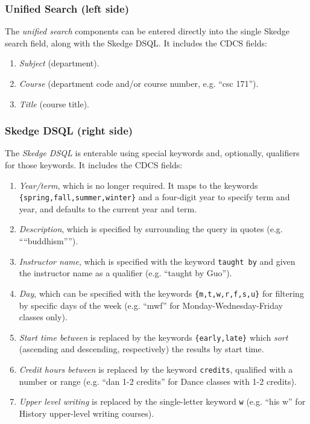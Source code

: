 \subsubsection{Unified Search (left side)}

The \emph{unified search} components can be entered directly into the single Skedge search field, along with the Skedge DSQL. It includes the CDCS fields:

\begin{enumerate}
  \item \emph{Subject} (department).
  \item \emph{Course} (department code and/or course number, e.g. ``csc 171'').
  \item \emph{Title} (course title).
\end{enumerate}

\subsubsection{Skedge DSQL (right side)}

The \emph{Skedge DSQL} is enterable using special keywords and, optionally, qualifiers for those keywords. It includes the CDCS fields:

\begin{enumerate}
  \item \emph{Year/term}, which is no longer required. It maps to the keywords {\tt \{spring,fall,summer,winter\}} and a four-digit year to specify term and year, and defaults to the current year and term.

  \item \emph{Description}, which is specified by surrounding the query in quotes (e.g. ````buddhism'''').

  \item \emph{Instructor name}, which is specified with the keyword {\tt taught by} and given the instructor name as a qualifier (e.g. ``taught by Guo'').

  \item \emph{Day}, which can be specified with the keywords {\tt \{m,t,w,r,f,s,u\}} for filtering by specific days of the week (e.g. ``mwf'' for Monday-Wednesday-Friday classes only).

  \item \emph{Start time between} is replaced by the keywords {\tt \{early,late\}} which \emph{sort} (ascending and descending, respectively) the results by start time.

  \item \emph{Credit hours between} is replaced by the keyword {\tt credits}, qualified with a number or range (e.g. ``dan 1-2 credits'' for Dance classes with 1-2 credits).

  \item \emph{Upper level writing} is replaced by the single-letter keyword {\tt w} (e.g. ``his w'' for History upper-level writing courses).
\end{enumerate}

